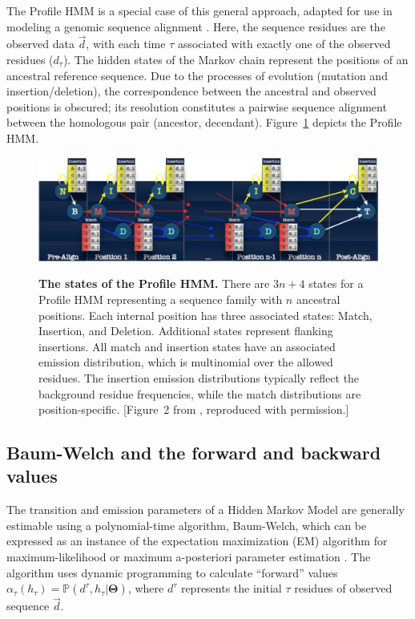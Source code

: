 \documentclass[preprint,12pt,authoryear]{elsarticle}
\newcommand{\Parameters}{\ensuremath{\bm{\Theta}}}
\newcommand{\datum}{\ensuremath{d}}
\newcommand{\hiddenState}{\ensuremath{h}}
\newcommand{\Time}{\ensuremath{\tau}}
\newcommand{\forward}{\ensuremath{\alpha}}
\newcommand{\Prob}{\ensuremath{\mathbb P}}
\begin{document}
The Profile HMM is a special case of this general approach, adapted for use in modeling a genomic sequence alignment \citep{Durbin}.  Here, the sequence residues are the observed data $\vec{\datum}$, with each time $\Time$ associated with exactly one of the observed residues ($\datum_{\Time}$).  The hidden states of the Markov chain represent the positions of an ancestral reference sequence.  Due to the processes of evolution (mutation and insertion/deletion), the correspondence between the ancestral and observed positions is obscured; its resolution constitutes a pairwise sequence alignment between the homologous pair (ancestor, decendant). Figure~\ref{cbw_fig:Plan7} depicts the Profile HMM.

\begin{figure}[htp]
\centering
\includegraphics[scale=.445]{Plan7.pdf} \\
 \caption{\textbf{The states of the Profile HMM.} There are $3n + 4$ states for a Profile HMM representing a sequence family with $n$ ancestral positions.  Each internal position has three associated states: Match, Insertion, and Deletion.  Additional states represent flanking insertions.  All match and insertion states have an associated emission distribution, which is multinomial over the allowed residues.  The insertion emission distributions typically reflect the background residue frequencies, while the match distributions are position-specific. [Figure~2 from \cite{edlefsen2010transposon}, reproduced with permission.]}
  \label{cbw_fig:Plan7}
\end{figure}

\subsection{Baum-Welch and the forward and backward values}
The transition and emission parameters of a Hidden Markov Model are generally estimable using a polynomial-time algorithm, Baum-Welch, which can be expressed as an instance of the expectation maximization (EM) algorithm for maximum-likelihood or maximum a-posteriori parameter estimation \citep{Baum:1972, DempsterEM:1977, Rabiner:1989}.  The algorithm uses dynamic programming to calculate ``forward'' values $\forward_{\Time}( \hiddenState_{\Time} ) = \Prob( \datum^{\Time}, \hiddenState_{\Time} | \Parameters )$, where $\datum^{\Time}$ represents the initial $\Time$ residues of observed sequence $\vec{\datum}$.
\end{document}
